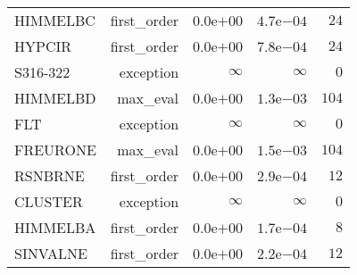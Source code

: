 \begin{longtable}[c]{lrrrr}
HIMMELBC & first\_order & \( 0.0\)e\(+00\) & \( 4.7\)e\(-04\) & \(   24\) \\
HYPCIR & first\_order & \( 0.0\)e\(+00\) & \( 7.8\)e\(-04\) & \(   24\) \\
S316-322 & exception & \(\infty\) & \(\infty\) & \(    0\) \\
HIMMELBD & max\_eval & \( 0.0\)e\(+00\) & \( 1.3\)e\(-03\) & \(  104\) \\
FLT & exception & \(\infty\) & \(\infty\) & \(    0\) \\
FREURONE & max\_eval & \( 0.0\)e\(+00\) & \( 1.5\)e\(-03\) & \(  104\) \\
RSNBRNE & first\_order & \( 0.0\)e\(+00\) & \( 2.9\)e\(-04\) & \(   12\) \\
CLUSTER & exception & \(\infty\) & \(\infty\) & \(    0\) \\
HIMMELBA & first\_order & \( 0.0\)e\(+00\) & \( 1.7\)e\(-04\) & \(    8\) \\
SINVALNE & first\_order & \( 0.0\)e\(+00\) & \( 2.2\)e\(-04\) & \(   12\) \\
\hline 
\end{longtable}
